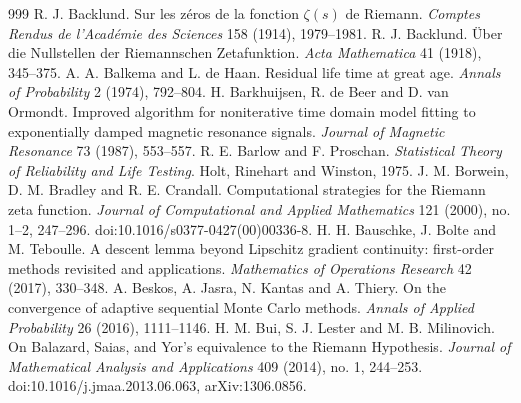 \begin{thebibliography}{999}
 R. J. Backlund. Sur les z\'eros de la fonction $\zeta(s)$ de Riemann. \emph{Comptes Rendus de l'Acad\'emie des Sciences} 158 (1914), 1979--1981.
 R. J. Backlund. \"Uber die Nullstellen der Riemannschen Zetafunktion. \emph{Acta Mathematica} 41 (1918), 345--375.
 A. A. Balkema and L. de Haan. Residual life time at great age. \emph{Annals of Probability} 2 (1974), 792--804.
 H. Barkhuijsen, R. de Beer and D. van Ormondt. Improved algorithm for noniterative time domain model fitting to exponentially damped magnetic resonance signals. \emph{Journal of Magnetic Resonance} 73 (1987), 553--557.
 R. E. Barlow and F. Proschan. \emph{Statistical Theory of Reliability and Life Testing}. Holt, Rinehart and Winston, 1975.
 J. M. Borwein, D. M. Bradley and R. E. Crandall. Computational strategies for the Riemann zeta function. \emph{Journal of Computational and Applied Mathematics} 121 (2000), no. 1--2, 247--296. doi:10.1016/s0377-0427(00)00336-8.
 H. H. Bauschke, J. Bolte and M. Teboulle. A descent lemma beyond Lipschitz gradient continuity: first-order methods revisited and applications. \emph{Mathematics of Operations Research} 42 (2017), 330--348.
 A. Beskos, A. Jasra, N. Kantas and A. Thiery. On the convergence of adaptive sequential Monte Carlo methods. \emph{Annals of Applied Probability} 26 (2016), 1111--1146.
 H. M. Bui, S. J. Lester and M. B. Milinovich. On Balazard, Saias, and Yor's equivalence to the Riemann Hypothesis. \emph{Journal of Mathematical Analysis and Applications} 409 (2014), no. 1, 244--253. doi:10.1016/j.jmaa.2013.06.063, arXiv:1306.0856.

\end{thebibliography}
